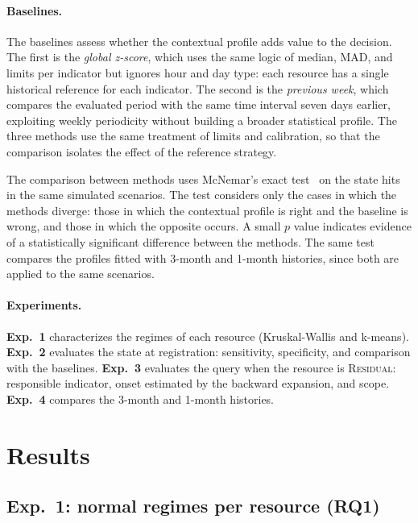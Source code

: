 \documentclass[sigconf,nonacm]{acmart}
\newcommand{\Residual}{\textsc{Residual}\xspace}
\begin{document}
\paragraph{Baselines.} The baselines assess whether the contextual profile adds value to the decision. The first is the \emph{global z-score}, which uses the same logic of median, MAD, and limits per indicator but ignores hour and day type: each resource has a single historical reference for each indicator. The second is the \emph{previous week}, which compares the evaluated period with the same time interval seven days earlier, exploiting weekly periodicity without building a broader statistical profile. The three methods use the same treatment of limits and calibration, so that the comparison isolates the effect of the reference strategy.

The comparison between methods uses McNemar's exact test~\citep{mcnemar1947note} on the state hits in the same simulated scenarios. The test considers only the cases in which the methods diverge: those in which the contextual profile is right and the baseline is wrong, and those in which the opposite occurs. A small $p$ value indicates evidence of a statistically significant difference between the methods. The same test compares the profiles fitted with 3-month and 1-month histories, since both are applied to the same scenarios.

\paragraph{Experiments.} \textbf{Exp.~1} characterizes the regimes of each resource (Kruskal-Wallis and k-means). \textbf{Exp.~2} evaluates the state at registration: sensitivity, specificity, and comparison with the baselines. \textbf{Exp.~3} evaluates the query when the resource is \Residual: responsible indicator, onset estimated by the backward expansion, and scope. \textbf{Exp.~4} compares the 3-month and 1-month histories.

\section{Results}\label{sec:resultados}

\subsection{Exp.~1: normal regimes per resource (RQ1)}
\end{document}
